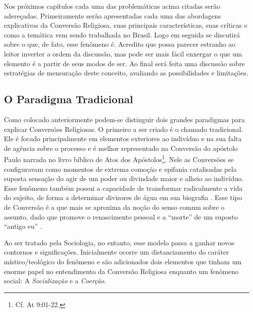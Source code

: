 \documentclass[
	12pt,				%
	oneside,			%
	a4paper,			%
	sumario=tradicional,
	english,			%
	brazil				%
	]{abntex2}
\begin{document}
Nos próximos capítulos cada uma das problemáticas acima citadas serão adereçadas. Primeiramente serão apresentadas cada uma das abordagens explicativas da Conversão Religiosa, suas principais características, suas críticas e como a temática vem sendo trabalhada no Brasil. Logo em seguida se discutirá sobre o que, de fato, esse fenômeno é. Acredito que possa parecer estranho ao leitor inverter a ordem da discussão, mas pode ser mais fácil enxergar o que um elemento é a partir de seus modos de ser. Ao final será feita uma discussão sobre estratégias de mensuração deste conceito, avaliando as possibilidades e limitações.

\hypertarget{o-paradigma-tradicional}{%
\subsection{O Paradigma Tradicional}\label{o-paradigma-tradicional}}

Como colocado anteriormente podem-se distinguir dois grandes paradigmas para explicar Conversões Religiosas. O primeiro a ser criado é o chamado tradicional. Ele é focado principalmente em elementos exteriores ao indivíduo e na sua falta de agência sobre o processo e é melhor representado na Conversão do apóstolo Paulo narrada no livro bíblico de Atos dos Apóstolos\footnote{Cf. At 9:01-22.}. Nele as Conversões se configuravam como momentos de extrema comoção e epifania catalisadas pela suposta sensação do agir de um poder ou divindade maior e alheio ao indivíduo. Esse fenômeno também possui a capacidade de transformar radicalmente a vida do sujeito, de forma a determinar divisores de água em sua biografia \autocite[165]{richardson_active_1985}. Esse tipo de Conversão é a que mais se aproxima da noção do senso comum sobre o assunto, dado que promove o renascimento pessoal e a ``morte'' de um suposto ``antigo eu'' \autocite[1]{kilbourne_paradigm_1989}.

Ao ser tratado pela Sociologia, no entanto, esse modelo passa a ganhar novos contornos e significações. Inicialmente ocorre um distanciamento do caráter místico/teológico do fenômeno e são adicionados dois elementos que tinham um enorme papel no entendimento da Conversão Religiosa enquanto um fenômeno social: A \emph{Socialização} e a \emph{Coerção}.
\end{document}
